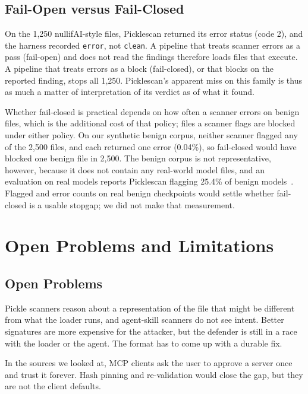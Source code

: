 \documentclass[conference]{IEEEtran}
\begin{document}
\subsection{Fail-Open versus Fail-Closed}
\label{sec:failclosed}

On the 1,250 nullifAI-style files, Picklescan returned its error status (code 2), and the harness recorded \texttt{error}, not \texttt{clean}. A pipeline that treats scanner errors as a pass (fail-open) and does not read the findings therefore loads files that execute. A pipeline that treats errors as a block (fail-closed), or that blocks on the reported finding, stops all 1,250. Picklescan's apparent miss on this family is thus as much a matter of interpretation of its verdict as of what it found.

Whether fail-closed is practical depends on how often a scanner errors on benign files, which is the additional cost of that policy; files a scanner flags are blocked under either policy. On our synthetic benign corpus, neither scanner flagged any of the 2,500 files, and each returned one error (0.04\%), so fail-closed would have blocked one benign file in 2,500. The benign corpus is not representative, however, because it does not contain any real-world model files, and an evaluation on real models reports Picklescan flagging 25.4\% of benign models~\cite{qin2026}. Flagged and error counts on real benign checkpoints would settle whether fail-closed is a usable stopgap; we did not make that measurement.

\section{Open Problems and Limitations}
\label{sec:discuss}

\subsection{Open Problems}

Pickle scanners reason about a representation of the file that might be different from what the loader runs, and agent-skill scanners do not see intent. Better signatures are more expensive for the attacker, but the defender is still in a race with the loader or the agent. The format has to come up with a durable fix.

In the sources we looked at, MCP clients ask the user to approve a server once and trust it forever. Hash pinning and re-validation would close the gap, but they are not the client defaults.
\end{document}
